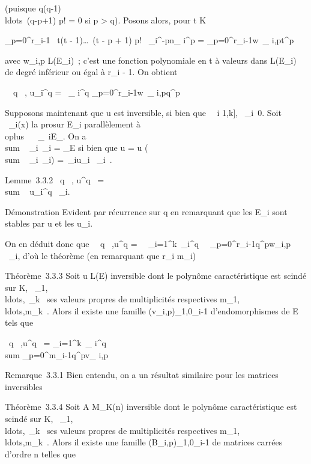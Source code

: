 \documentclass[]{article}
\begin{document}
(puisque 
q(q-1)\\ldots~(q-p+1)
\over p! = 0 si p \textgreater{} q). Posons alors, pour
t \in K

\sum \_p=0^r\_i-1~ t(t -
1)\ldots~(t - p + 1) \over
p! \lambda~\_i^-pn\_ i^p =
\sum \_p=0^r\_i-1w~\_
i,pt^p

avec w\_i,p \in L(E\_i)~; c'est une fonction polynomiale
en t à valeurs dans L(E\_i) de degré inférieur ou égal à
r\_i - 1. On obtient

\forall~~q \in {}~,\quad
u\_i^q = \lambda~\_ i^q
\sum \_p=0^r\_i-1w~\_
i,pq^p

Supposons maintenant que u est inversible, si bien que
\forall~~i \in {[}1,k{]},
\lambda~\_i\neq~0. Soit \pi~\_i(x) la
pro\jmathection sur E\_i parallèlement à
\\oplus~ ~
\_\jmath\neq~iE\_\jmath. On a
\\sum ~
\_i\pi~\_i = \mathrmId\_E si bien
que u = u \cdot (\\sum ~
\_i\pi~\_i) =\
\sum  \_iu\_i \cdot \pi~\_i~.

Lemme~3.3.2 \forall~q \in {}~, u^q~
= \\sum ~
u\_i^q \cdot \pi~\_i.

Démonstration Evident par récurrence sur q en remarquant que les
E\_i sont stables par u et les u\_i.

On en déduit donc que \forall~~q \in
{}~,\quad u^q =\
\sum ~
\_i=1^k\lambda~\_i^q\
\sum ~
\_p=0^r\_i-1q^pw\_i,p \cdot
\pi~\_i, d'où le théorème (en remarquant que r\_i \leq
m\_i)

Théorème~3.3.3 Soit u \in L(E) inversible dont le polynôme caractéristique
est scindé sur K,
\lambda~\_1,\\ldots,\lambda~\_k~
ses valeurs propres de multiplicités respectives
m\_1,\\ldots,m\_k~.
Alors il existe une famille
(v\_i,p)\_1\leqi\leqk,0\leqp\leqm\_i-1 d'endomorphismes de E
tels que

\forall~q \in \mathbb{N}~,\quad u^q~ =
\sum \_i=1^k\lambda~\_ i^q~
\\sum
\_p=0^m\_i-1q^pv\_ i,p

Remarque~3.3.1 Bien entendu, on a un résultat similaire pour les
matrices inversibles

Théorème~3.3.4 Soit A \in M\_K(n) inversible dont le polynôme
caractéristique est scindé sur K,
\lambda~\_1,\\ldots,\lambda~\_k~
ses valeurs propres de multiplicités respectives
m\_1,\\ldots,m\_k~.
Alors il existe une famille
(B\_i,p)\_1\leqi\leqk,0\leqp\leqm\_i-1 de matrices carrées
d'ordre n telles que
\end{document}
